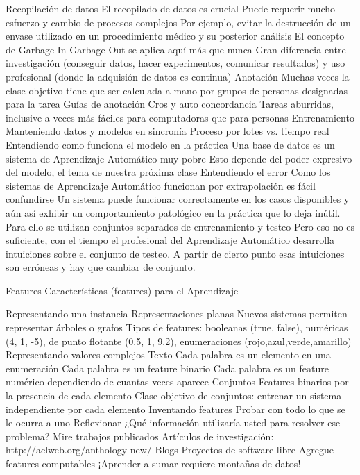 Recopilación de datos
El recopilado de datos es crucial
Puede requerir mucho esfuerzo y cambio de procesos complejos
Por ejemplo, evitar la destrucción de un envase utilizado en un procedimiento médico y su posterior análisis
El concepto de Garbage-In-Garbage-Out se aplica aquí más que nunca
Gran diferencia entre investigación (conseguir datos, hacer experimentos, comunicar resultados) y uso profesional (donde la adquisión de datos es continua)
Anotación
Muchas veces la clase objetivo tiene que ser calculada a mano por grupos de personas designadas para la tarea
Guías de anotación
Cros y auto concordancia
Tareas aburridas, inclusive a veces más fáciles para computadoras que para personas
Entrenamiento
Manteniendo datos y modelos en sincronía
Proceso por lotes vs. tiempo real
Entendiendo como funciona el modelo en la práctica
Una base de datos es un sistema de Aprendizaje Automático muy pobre
Esto depende del poder expresivo del modelo, el tema de nuestra próxima clase
Entendiendo el error
Como los sistemas de Aprendizaje Automático funcionan por extrapolación es fácil confundirse
Un sistema puede funcionar correctamente en los casos disponibles y aún así exhibir un comportamiento patológico en la práctica que lo deja inútil.
Para ello se utilizan conjuntos separados de entrenamiento y testeo
Pero eso no es suficiente, con el tiempo el profesional del Aprendizaje Automático desarrolla intuiciones sobre el conjunto de testeo. A partir de cierto punto esas intuiciones son erróneas y hay que cambiar de conjunto.


Features
Características (features) para el Aprendizaje

Representando una instancia
Representaciones planas
Nuevos sistemas permiten representar árboles o grafos
Tipos de features: booleanas (true, false), numéricas (4, 1, -5), de punto flotante (0.5, 1, 9.2), enumeraciones (rojo,azul,verde,amarillo)
Representando valores complejos
Texto
Cada palabra es un elemento en una enumeración
Cada palabra es un feature binario
Cada palabra es un feature numérico dependiendo de cuantas veces aparece
Conjuntos
Features binarios por la presencia de cada elemento
Clase objetivo de conjuntos: entrenar un sistema independiente por cada elemento
Inventando features
Probar con todo lo que se le ocurra a uno
Reflexionar
¿Qué información utilizaría usted para resolver ese problema?
Mire trabajos publicados
Artículos de investigación: http://aclweb.org/anthology-new/
Blogs
Proyectos de software libre
Agregue features computables
¡Aprender a sumar requiere montañas de datos!

